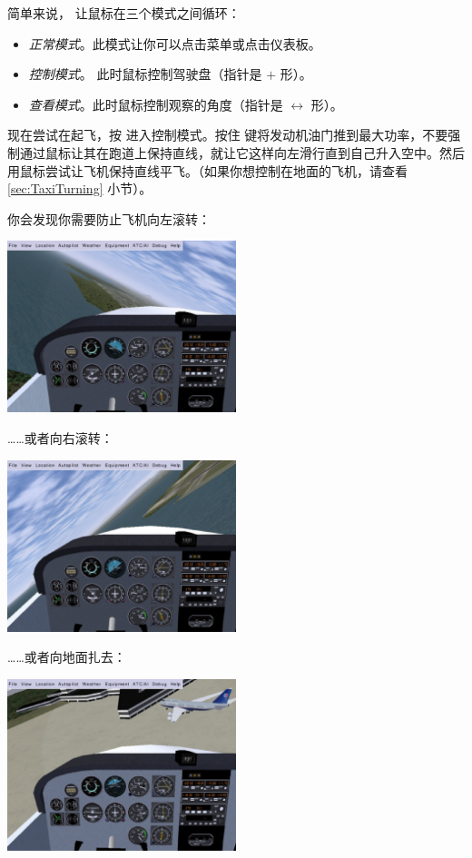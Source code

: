 简单来说， 让鼠标在三个模式之间循环：
\begin{itemize}
    \item \textit{正常模式}。此模式让你可以点击菜单或点击仪表板。
    \item \textit{控制模式}。 此时鼠标控制驾驶盘（指针是 $+$ 形）。
    \item \textit{查看模式}。此时鼠标控制观察的角度（指针是 $\leftrightarrow$ 形）。
\end{itemize}

现在尝试在起飞，按  进入控制模式。按住  键将发动机油门推到最大功率，不要强制通过鼠标让其在跑道上保持直线，就让它这样向左滑行直到自己升入空中。然后用鼠标尝试让飞机保持直线平飞。（如果你想控制在地面的飞机，请查看 \ref{sec:TaxiTurning} 小节）。

你会发现你需要防止飞机向左滚转：

\begin{center}
\includegraphics[width=0.5\textwidth]{img/tut_11}
\end{center}

……或者向右滚转：


\begin{center}
\includegraphics[width=0.5\textwidth]{img/tut_12}
\end{center}

……或者向地面扎去：


\begin{center}
\includegraphics[width=0.5\textwidth]{img/tut_13}
\end{center}

